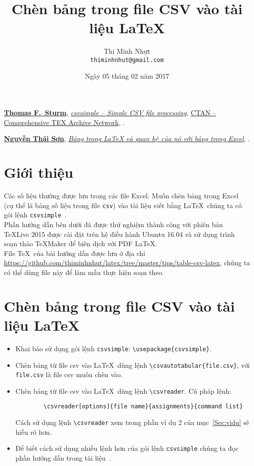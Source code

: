 \documentclass[12pt,a4paper]{article}
\title{\bfseries \huge Chèn bảng trong file CSV vào tài liệu \LaTeX}
\author{\Large Thi Minh Nhựt \bigskip \\ \Large \texttt{thiminhnhut@gmail.com}}
\date{\Large Ngày 05 tháng 02 năm 2017}
\begin{document}
\maketitle
\tableofcontents

\begin{thebibliography}{99}
   \href{https://www.ctan.org/author/sturm}{\textbf{Thomas F.~Sturm}}, \href{https://www.ctan.org/pkg/csvsimple}{\emph{csvsimple – Simple CSV file processing}}, \href{https://www.ctan.org/}{CTAN -- Comprehensive TEX Archive Network}, .

   \href{https://osshcmup.wordpress.com/}{\textbf{Nguyễn Thái Sơn}}, \href{https://goo.gl/F3o77y}{\emph{Bảng trong LaTeX và quan hệ của nó với bảng trong Excel}}, .
\end{thebibliography}

\section{Giới thiệu}
Các số liệu thường được lưu trong các file Excel. Muốn chèn bảng trong Excel (cụ thể là bảng số liệu trong file \verb|csv|) vào tài liệu viết bằng \LaTeX\, chúng ta có gói lệnh \verb|csvsimple|~\cite{csvsimple-ctan}.\\

Phần hướng dẫn bên dưới đã được thử nghiệm thành công với phiên bản \TeX Live 2015 được cài đặt trên hệ điều hành Ubuntu 16.04 và sử dụng trình soạn thảo \TeX Maker để biên dịch với PDF \LaTeX. \\

File \TeX\ của bài hướng dẫn được lưu ở địa chỉ \url{https://github.com/thiminhnhut/latex/tree/master/tips/table-csv-latex}, chúng ta có thể dùng file này để làm mẫu thực hiện soạn theo.

\section{Chèn bảng trong file CSV vào tài liệu \LaTeX}
\begin{itemize}
  \item Khai báo sử dụng gói lệnh \verb|csvsimple|: \verb|\usepackage{csvsimple}|.

  \item Chèn bảng từ file csv vào \LaTeX\ dùng lệnh \verb|\csvautotabular{file.csv}|, với \verb|file.csv| là file csv muốn chèn vào.

  \item Chèn bảng từ file csv vào \LaTeX\ dùng lệnh \verb|\csvreader|. Cú pháp lệnh:
        \begin{verbatim}
        \csvreader[options]{file name}{assignments}{command list}
      \end{verbatim}

        Cách sử dụng lệnh \verb|\csvreader| xem trong phần ví dụ 2 của mục~\ref{Sec:vidu} sẽ hiễu rõ hơn.

  \item Để biết cách sử dụng nhiều lệnh hơn của gói lệnh \verb|csvsimple| chúng ta đọc phần hướng dẫn trong tài liệu~\cite{csvsimple-ctan}.
\end{itemize}
\end{document}
